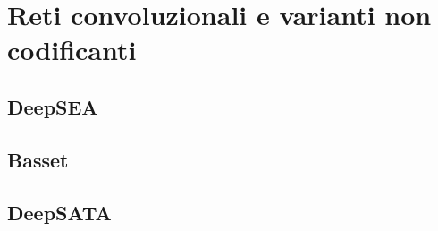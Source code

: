 
\chapter{Reti convoluzionali e varianti non codificanti}\label{chp:CNN-non-coding-variants}

\section{DeepSEA}

\section{Basset}

\section{DeepSATA}
